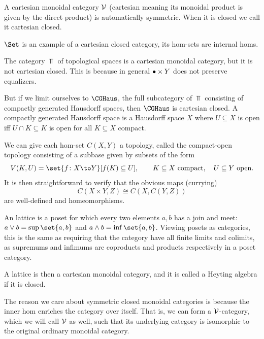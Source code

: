 \bnote

    A cartesian monoidal category ${{\cal V}}$ (cartesian meaning its monoidal product is given by the direct product) is automatically
    symmetric.
    When it is closed we call it {\emphcolor cartesian closed}.

    $\Set$ is an example of a cartesian closed category, its hom-sets are internal homs.

\enote

\bexam

    The category $\Top$ of topological spaces is a cartesian monoidal category, but it is not cartesian closed.
    This is because in general $\bullet\times Y$ does not preserve equalizers.

    But if we limit ourselves to $\CGHaus$, the full subcategory of $\Top$ consisting of compactly generated Hausdorff spaces, 
    then $\CGHaus$ is cartesian closed.
    A compactly generated Hausdorff space is a Hausdorff space $X$ where $U\subseteq X$ is open iff $U\cap K\subseteq K$ is open
    for all $K\subseteq X$ compact.

    We can give each hom-set $C(X,Y)$ a topology, called the {\emphcolor compact-open topology} consisting of a subbase
    given by subsets of the form
    $$ V(K,U) = \set{f\colon X\to Y}[f(K)\subseteq U],\qquad K\subseteq X\hbox{ compact},\quad U\subseteq Y\hbox{ open} . $$
    It is then straightforward to verify that the obvious maps (currying)
    $$ C(X\times Y,Z) \cong C(X,C(Y,Z)) $$
    are well-defined and homeomorphisms.

\eexam

\bexam

    An {\emphcolor lattice} is a poset for which every two elements $a,b$ has a {\emphcolor join} and {\emphcolor meet}:
    $a\vee b=\sup\set{a,b}$ and $a\wedge b=\inf\set{a,b}$.
    Viewing posets as categories, this is the same as requiring that the category have all finite limits and colimits,
    as supremums and infimums are coproducts and products respectively in a poset category.

    A lattice is then a cartesian monoidal category, and it is called a {\emphcolor Heyting algebra} if it is closed.

\eexam

The reason we care about symmetric closed monoidal categories is because the inner hom enriches the category over itself.
That is, we can form a ${{\cal V}}$-category, which we will call ${{\cal V}}$ as well, such that its underlying category is isomorphic to
the original ordinary monoidal category.

